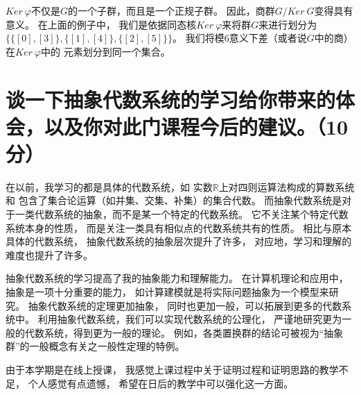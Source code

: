 \documentclass[12pt,onecolumn]{article}
\theoremstyle{plain}
\begin{document}
$Ker~\varphi$不仅是$G$的一个子群，而且是一个正规子群。
因此，商群$G / Ker~G$变得具有意义。
在上面的例子中，
我们是依据同态核$Ker~\varphi$来将群$G$来进行划分为
$\{\{[0], [3]\}, \{[1], [4]\}, \{[2], [5]\}\}$。
我们将模6意义下差（或者说$G$中的商）在$Ker~\varphi$中的
元素划分到同一个集合。


\section{谈一下抽象代数系统的学习给你带来的体会，以及你对此门课程今后的建议。（10分）}
在以前，我学习的都是具体的代数系统，如
实数$\mathbb{R}$上对四则运算法构成的算数系统和
包含了集合论运算（如并集、交集、补集）的集合代数。
而抽象代数系统是对于一类代数系统的抽象，而不是某一个特定的代数系统。
它不关注某个特定代数系统本身的性质，
而是关注一类具有相似点的代数系统共有的性质。
相比与原本具体的代数系统，
抽象代数系统的抽象层次提升了许多，
对应地，学习和理解的难度也提升了许多。

抽象代数系统的学习提高了我的抽象能力和理解能力。
在计算机理论和应用中，
抽象是一项十分重要的能力，
如计算建模就是将实际问题抽象为一个模型来研究。
抽象代数系统的定理更加抽象，
同时也更加一般，可以拓展到更多的代数系统中。
利用抽象代数系统，我们可以实现代数系统的公理化，
严谨地研究更为一般的代数系统，得到更为一般的理论。
例如，各类置换群的结论可被视为“抽象群”的一般概念有关之一般性定理的特例。

由于本学期是在线上授课，
我感觉上课过程中关于证明过程和证明思路的教学不足，
个人感觉有点遗憾，
希望在日后的教学中可以强化这一方面。
\end{document}
